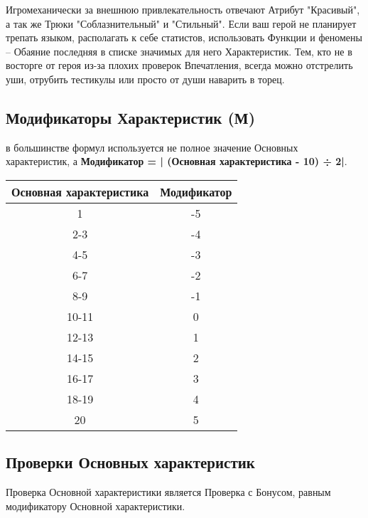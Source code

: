 \begin{tcolorbox}
    Игромеханически за внешнюю привлекательность отвечают Атрибут "Красивый", а так же Трюки "Соблазнительный" и "Стильный". 
    \newline Если ваш герой не планирует трепать языком, располагать к себе статистов, использовать Функции и феномены – Обаяние последняя в списке значимых для него Характеристик. Тем, кто не в восторге от героя из-за плохих проверок Впечатления, всегда можно отстрелить уши, отрубить тестикулы или просто от души наварить в торец.
\end{tcolorbox}

\subsection{Модификаторы Характеристик (М)} в большинстве формул используется не полное значение Основных характеристик, а \textbf{Модификатор = | (Основная характеристика - 10) ÷ 2|}.
\begin{center}
\begin{tabular}{ |c|c| }
\hline
\textbf{Основная характеристика} & \textbf{Модификатор}
\\ \hline
1 & -5
\\ \hline
2-3 & -4
\\ \hline
4-5 & -3
\\ \hline
6-7 & -2
\\ \hline
8-9 & -1
\\ \hline
10-11 & 0
\\ \hline
12-13 & 1
\\ \hline
14-15 & 2
\\ \hline
16-17 & 3
\\ \hline
18-19 & 4
\\ \hline
20 & 5
\\ \hline
\end{tabular}
\end{center}
\subsection{Проверки Основных характеристик}
Проверка Основной характеристики является Проверка с Бонусом, равным модификатору Основной характеристики.

